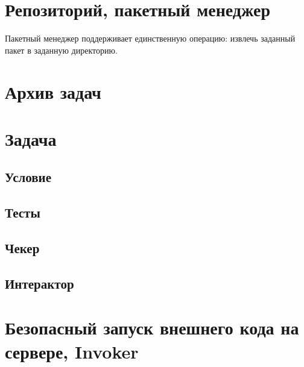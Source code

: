 \section{Репозиторий, пакетный менеджер}
\label{bunsanpm}
Пакетный менеджер поддерживает единственную операцию:
извлечь заданный пакет в заданную директорию.

\section{Архив задач}

\section{Задача}

\subsection{}

\subsection{Условие}

\subsection{Тесты}

\subsection{Чекер}

\subsection{Интерактор}

\section{Безопасный запуск внешнего кода на сервере, Invoker}
